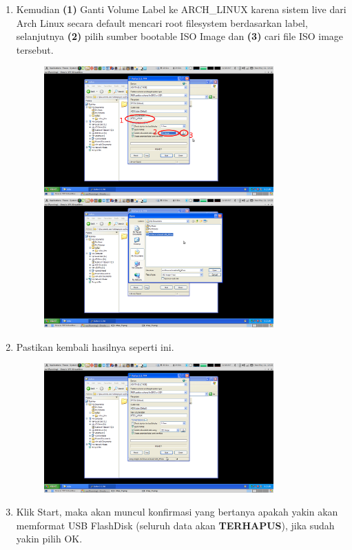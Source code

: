\documentclass[12pt,]{article}
\begin{document}
\begin{enumerate}
		\item Kemudian \textbf{(1)} Ganti Volume Label ke ARCH\_LINUX karena sistem live dari Arch Linux secara default mencari root filesystem berdasarkan label,
		selanjutnya \textbf{(2)} pilih sumber bootable ISO Image
		dan \textbf{(3)} cari file ISO image tersebut.
		
		\begin{figure}[h]
			\centering
			\includegraphics[width=250pt]{usbwin/step_4}
			\includegraphics[width=250pt]{usbwin/step_5}
		\end{figure}
	
		\item Pastikan kembali hasilnya seperti ini.
		
		\newpage
		\begin{figure}[h]
			\centering
			\includegraphics[width=250pt]{usbwin/step_6}
		\end{figure}
	
		\item Klik Start, maka akan muncul konfirmasi yang bertanya apakah yakin akan memformat USB FlashDisk (seluruh data akan \textbf{TERHAPUS}),
		jika sudah yakin pilih OK.


\end{enumerate}
\end{document}
